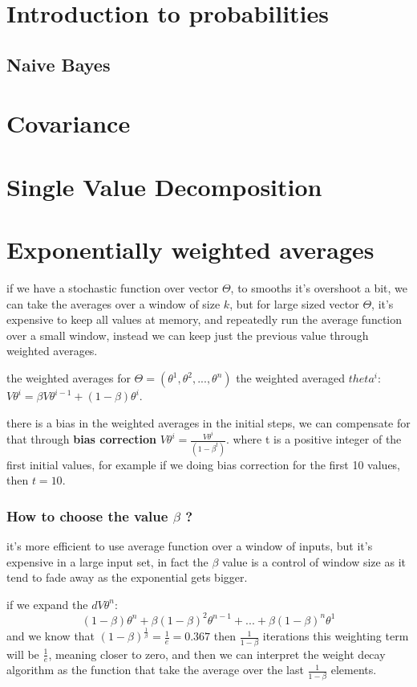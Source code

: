 \documentclass[4apaper,12pt]{book}
\begin{document}
\begin{appendices}
  \chapter{Introduction to probabilities}
  \section {Naive Bayes}
  \chapter{Covariance}
  \chapter{Single Value Decomposition}
  \chapter {Exponentially weighted averages}
  \begin{description}
  \item if we have a stochastic function over vector $\Theta$, to smooths it's overshoot a bit, we can take the averages over a window of size $k$, but for large sized vector $\Theta$, it's expensive to keep all values at memory, and repeatedly run the average function over a small window, instead we can keep just the previous value through weighted averages.
  \item the weighted averages for $\Theta=(\theta^1,\theta^2,...,\theta^n)$ the weighted averaged $theta^i$: $V\theta^i=\beta V \theta^{i-1} + (1-\beta) \theta^i$.
  \item there is a bias in the weighted averages in the initial steps, we can compensate for that through \textbf{bias correction} $V\theta^i=\frac{V\theta^i}{(1-\beta^t)}$. where t is a positive integer of the first initial values, for example if we doing bias correction for the first 10 values, then $t=10$.
    \subsection {How to choose the value $\beta$ ?}
    \begin{description}
    \item it's more efficient to use average function over a window of inputs, but it's expensive in a large input set, in fact the $\beta$ value is a control of window size as it tend to fade away as the exponential gets bigger.
    \item if we expand the $dV\theta^n$: $$
      (1-\beta)\theta^{n} + \beta(1-\beta)^2\theta^{n-1} + ... + \beta(1-\beta)^{n}\theta^1
      $$ and we know that $(1-\beta)^{\frac{1}{\beta}} = \frac{1}{e} = 0.367$ then $\frac{1}{1-\beta}$ iterations this weighting term will be $\frac{1}{e}$, meaning closer to zero, and then we can interpret the weight decay algorithm as the function that take the average over the last $\frac{1}{1-\beta}$ elements.

    \end{description}
  \end{description}

\end{appendices}
\end{document}
